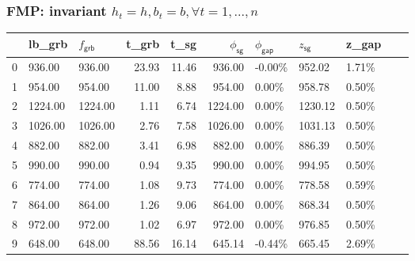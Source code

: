\begin{frame}
  \frametitle{FMP: invariant \(h_t = h, b_t = b, \forall t = 1, ..., n\)}
  \scriptsize
  \begin{tabular}{lllrrrlllll}
    \toprule
    {} & lb\_grb              & \(f_{\textsf{grb}}\)   & t\_grb
       & t\_sg                & \(\phi_{\textsf{sg}}\) & \(\phi_{\textsf{gap}}\)
       & \( z_{\textsf{sg}}\) & z\_gap                                                                                          \\
    \midrule
    0  & 936.00               & 936.00                 & 23.93                   & 11.46 & 936.00  & -0.00\% & 952.02  & 1.71\% \\
    1  & 954.00               & 954.00                 & 11.00                   & 8.88  & 954.00  & 0.00\%  & 958.78  & 0.50\% \\
    2  & 1224.00              & 1224.00                & 1.11                    & 6.74  & 1224.00 & 0.00\%  & 1230.12 & 0.50\% \\
    3  & 1026.00              & 1026.00                & 2.76                    & 7.58  & 1026.00 & 0.00\%  & 1031.13 & 0.50\% \\
    4  & 882.00               & 882.00                 & 3.41                    & 6.98  & 882.00  & 0.00\%  & 886.39  & 0.50\% \\
    5  & 990.00               & 990.00                 & 0.94                    & 9.35  & 990.00  & 0.00\%  & 994.95  & 0.50\% \\
    6  & 774.00               & 774.00                 & 1.08                    & 9.73  & 774.00  & 0.00\%  & 778.58  & 0.59\% \\
    7  & 864.00               & 864.00                 & 1.26                    & 9.06  & 864.00  & 0.00\%  & 868.34  & 0.50\% \\
    8  & 972.00               & 972.00                 & 1.02                    & 6.97  & 972.00  & 0.00\%  & 976.85  & 0.50\% \\
    9  & 648.00               & 648.00                 & 88.56                   & 16.14 & 645.14  & -0.44\% & 665.45  & 2.69\% \\
    \bottomrule
  \end{tabular}
  \normalsize
\end{frame}

